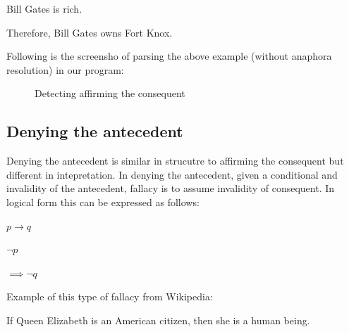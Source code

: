 \documentclass[english]{article}
\begin{document}
\begin{center}
Bill Gates is rich.
\par\end{center}

\begin{center}
Therefore, Bill Gates owns Fort Knox.
\par\end{center}

Following is the screensho of parsing the above example (without anaphora
resolution) in our program:

\begin{figure}[htp]
 \caption{Detecting affirming the consequent} \end{figure}


\subsection{Denying the antecedent}

Denying the antecedent is similar in strucutre to affirming the consequent
but different in intepretation. In denying the antecedent, given a
conditional and invalidity of the antecedent, fallacy is to assume
invalidity of consequent. In logical form this can be expressed as
follows:

\begin{center}
$p\to q$
\par\end{center}

\begin{center}
$\neg p$
\par\end{center}

\begin{center}
$\implies\neg q$
\par\end{center}

Example of this type of fallacy from Wikipedia: 

\begin{center}
If Queen Elizabeth is an American citizen, then she is a human being.
\par\end{center}
\end{document}
